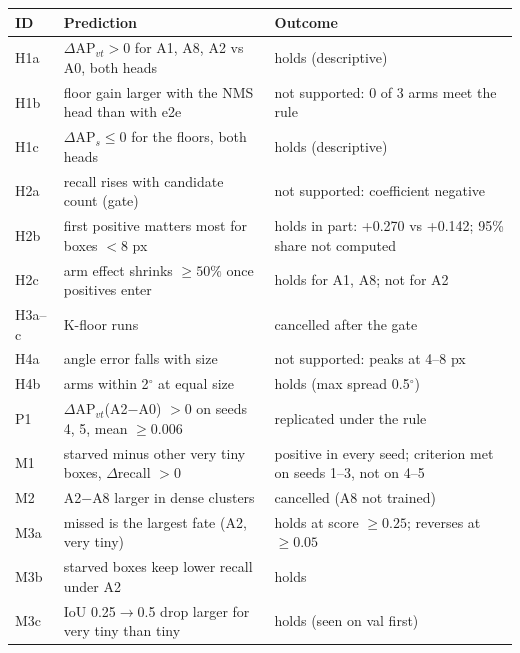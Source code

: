 \begin{tabular}{lp{6.2cm}p{6.2cm}}
\toprule
ID & Prediction & Outcome \\
\midrule
H1a & $\Delta$AP$_{vt}>0$ for A1, A8, A2 vs A0, both heads & holds (descriptive) \\
H1b & floor gain larger with the NMS head than with e2e & not supported: 0 of 3 arms meet the rule \\
H1c & $\Delta$AP$_s\leq 0$ for the floors, both heads & holds (descriptive) \\
H2a & recall rises with candidate count (gate) & not supported: coefficient negative \\
H2b & first positive matters most for boxes $<8$ px & holds in part: +0.270 vs +0.142; 95\% share not computed \\
H2c & arm effect shrinks $\geq 50\%$ once positives enter & holds for A1, A8; not for A2 \\
H3a--c & K-floor runs & cancelled after the gate \\
H4a & angle error falls with size & not supported: peaks at 4--8 px \\
H4b & arms within 2$^\circ$ at equal size & holds (max spread 0.5$^\circ$) \\
P1 & $\Delta$AP$_{vt}$(A2$-$A0) $>0$ on seeds 4, 5, mean $\geq 0.006$ & replicated under the rule \\
M1 & starved minus other very tiny boxes, $\Delta$recall $>0$ & positive in every seed; criterion met on seeds 1--3, not on 4--5 \\
M2 & A2$-$A8 larger in dense clusters & cancelled (A8 not trained) \\
M3a & missed is the largest fate (A2, very tiny) & holds at score $\geq 0.25$; reverses at $\geq 0.05$ \\
M3b & starved boxes keep lower recall under A2 & holds \\
M3c & IoU 0.25$\to$0.5 drop larger for very tiny than tiny & holds (seen on val first) \\
\bottomrule
\end{tabular}
